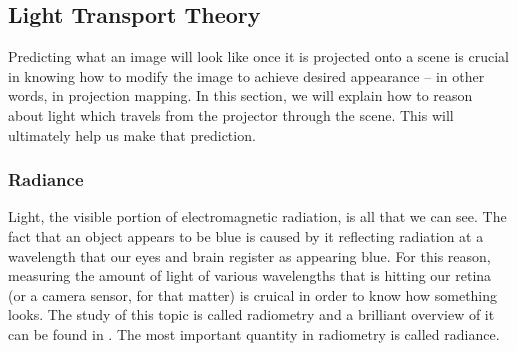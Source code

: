

\subsection{Light Transport Theory}
\label{section:background-projection_mapping-light_transport}

Predicting what an image will look like once it is projected onto a scene is crucial in knowing how to modify the image to achieve desired appearance -- in other words, in projection mapping. In this section, we will explain how to reason about light which travels from the projector through the scene. This will ultimately help us make that prediction.

\subsubsection{Radiance}
\label{section:background-projection_mapping-light_transport-radiance}

Light, the visible portion of electromagnetic radiation, is all that we can see. The fact that an object appears to be blue is caused by it reflecting radiation at a wavelength that our eyes and brain register as appearing blue. For this reason, measuring the amount of light of various wavelengths that is hitting our retina (or a camera sensor, for that matter) is cruical in order to know how something looks. The study of this topic is called radiometry and a brilliant overview of it can be found in \citet{PBRT3e}. The most important quantity in radiometry is called radiance.

